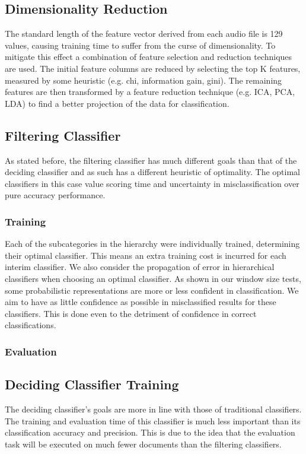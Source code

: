 \subsection{Dimensionality Reduction}
The standard length of the feature vector derived from each audio file is 129 values, causing training time to suffer from the curse of dimensionality. To mitigate this effect a combination of feature selection and reduction techniques are used. The initial feature columns are reduced by selecting the top K features, measured by some heuristic (e.g. chi, information gain, gini). The remaining features are then transformed by a feature reduction technique (e.g. ICA, PCA, LDA) to find a better projection of the data for classification.

\subsection{Filtering Classifier}
As stated before, the filtering classifier has much different goals than that of the deciding classifier and as such has a different heuristic of optimality. The optimal classifiers in this case value scoring time and uncertainty in misclassification over pure accuracy performance.

\subsubsection{Training}
Each of the subcategories in the hierarchy were individually trained, determining their optimal classifier. This means an extra training cost is incurred for each interim classifier. We also consider the propagation of error in hierarchical classifiers when choosing an optimal classifier. As shown in our window size tests, some probabilistic representations are more or less confident in classification. We aim to have as little confidence as possible in misclassified results for these classifiers. This is done even to the detriment of confidence in correct classifications.

\subsubsection{Evaluation}

\subsection{Deciding Classifier Training}
The deciding classifier's goals are more in line with those of traditional classifiers. The training and evaluation time of this classifier is much less important than its classification accuracy and precision. This is due to the idea that the evaluation task will be executed on much fewer documents than the filtering classifiers.

